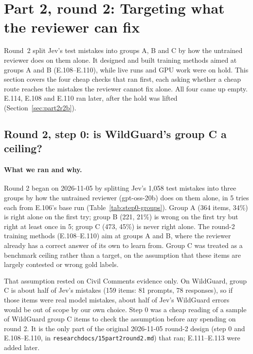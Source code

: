 \documentclass[11pt]{article}
\renewcommand{\_}{\origunderscore\allowbreak}
\begin{document}
\section{Part 2, round 2: Targeting what the reviewer can fix}\label{sec:part2r2}

Round~2 split Jev's test mistakes into groups A, B and C by how the untrained reviewer does on them alone. It designed and built training methods aimed at groups A and B (E.108--E.110), while live runs and GPU work were on hold. This section covers the four cheap checks that ran first, each asking whether a cheap route reaches the mistakes the reviewer cannot fix alone. All four came up empty. E.114, E.108 and E.110 ran later, after the hold was lifted (Section~\ref{sec:part2r2b}).

\subsection{Round 2, step 0: is WildGuard's group C a ceiling?}\label{sec:step0}

\paragraph{What we ran and why.}
Round 2 began on 2026-11-05 by splitting Jev's 1{,}058 test mistakes into three groups by how the untrained reviewer (gpt-oss-20b) does on them alone, in 5 tries each from E.106's base run (Table~\ref{tab:step0-groups}). Group A (364 items, 34\%) is right alone on the first try; group B (221, 21\%) is wrong on the first try but right at least once in 5; group C (473, 45\%) is never right alone. The round-2 training methods (E.108--E.110) aim at groups A and B, where the reviewer already has a correct answer of its own to learn from. Group C was treated as a benchmark ceiling rather than a target, on the assumption that these items are largely contested or wrong gold labels.

That assumption rested on Civil Comments evidence only. On WildGuard, group C is about half of Jev's mistakes (159 items: 81 prompts, 78 responses), so if those items were real model mistakes, about half of Jev's WildGuard errors would be out of scope by our own choice. Step 0 was a cheap reading of a sample of WildGuard group C items to check the assumption before any spending on round 2. It is the only part of the original 2026-11-05 round-2 design (step 0 and E.108--E.110, in \texttt{research\_docs/15\_part2\_round2.md}) that ran; E.111--E.113 were added later.
\end{document}
